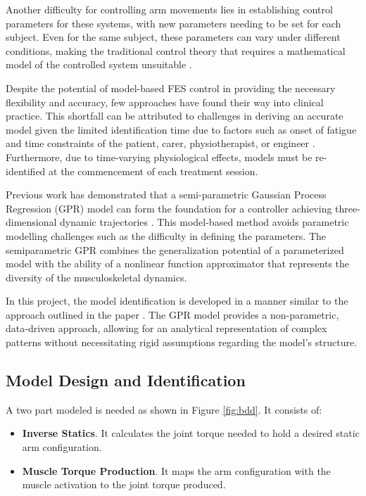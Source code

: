 Another difficulty for controlling arm movements lies in establishing control parameters for these systems, with new parameters needing to be set for each subject. Even for the same subject, these parameters can vary under different conditions, making the traditional control theory that requires a mathematical model of the controlled system unsuitable \cite{NNPID}. 

Despite the potential of model-based FES control in providing the necessary flexibility and accuracy, few approaches have found their way into clinical practice. This shortfall can be attributed to challenges in deriving an accurate model given the limited identification time due to factors such as onset of fatigue and time constraints of the patient, carer, physiotherapist, or engineer \cite{IOL}. Furthermore, due to time-varying physiological effects, models must be re-identified at the commencement of each treatment session.

Previous work has demonstrated that a semi-parametric Gaussian Process Regression (GPR) model can form the foundation for a controller achieving three-dimensional dynamic trajectories \cite{QSC}. This model-based method avoids parametric modelling challenges such as the difficulty in defining the parameters. The semiparametric GPR combines the generalization potential of a parameterized model with the ability of a nonlinear function approximator that represents the diversity of the musculoskeletal dynamics. 

In this project, the model identification is developed in a manner similar to the approach outlined in the paper \cite{QSC}. The GPR model provides a non-parametric, data-driven approach, allowing for an analytical representation of complex patterns without necessitating rigid assumptions regarding the model's structure.

\subsection{Model Design and Identification}

 A two part modeled is needed as shown in Figure \ref{fig:bdd}. It consists of:

 \begin{itemize}
     \item \textbf{Inverse Statics}. It calculates the joint torque needed to hold a desired static arm configuration.
     \item \textbf{Muscle Torque Production}. It maps the arm configuration with the muscle activation to the joint torque produced. 
 \end{itemize}

